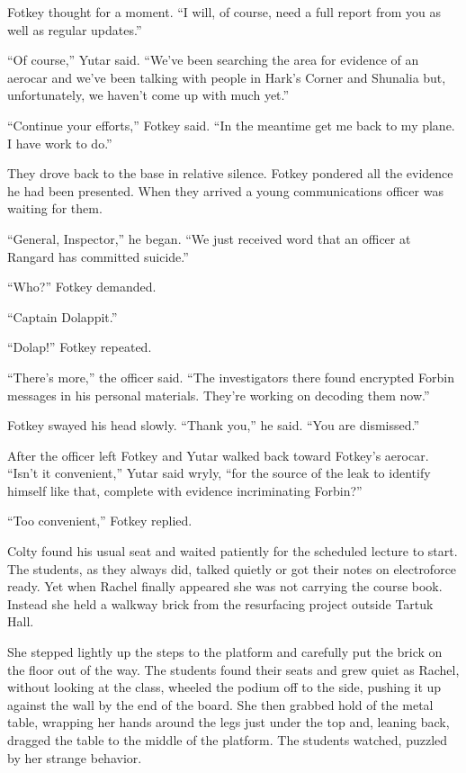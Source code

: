 Fotkey thought for a moment. ``I will, of course, need a full report from you as well as regular
updates.''

``Of course,'' Yutar said. ``We've been searching the area for evidence of an aerocar and we've
been talking with people in Hark's Corner and Shunalia but, unfortunately, we haven't come up
with much yet.''

``Continue your efforts,'' Fotkey said. ``In the meantime get me back to my plane. I have work
to do.''

They drove back to the base in relative silence. Fotkey pondered all the evidence he had been
presented. When they arrived a young communications officer was waiting for them.

``General, Inspector,'' he began. ``We just received word that an officer at Rangard has
committed suicide.''

``Who?'' Fotkey demanded.

``Captain Dolappit.''

``Dolap!'' Fotkey repeated.

``There's more,'' the officer said. ``The investigators there found encrypted Forbin messages in
his personal materials. They're working on decoding them now.''

Fotkey swayed his head slowly. ``Thank you,'' he said. ``You are dismissed.''

After the officer left Fotkey and Yutar walked back toward Fotkey's aerocar. ``Isn't it
convenient,'' Yutar said wryly, ``for the source of the leak to identify himself like that,
complete with evidence incriminating Forbin?''

``Too convenient,'' Fotkey replied.

\spacebreak

Colty found his usual seat and waited patiently for the scheduled lecture to start. The
students, as they always did, talked quietly or got their notes on electroforce ready. Yet when
Rachel finally appeared she was not carrying the course book. Instead she held a walkway brick
from the resurfacing project outside Tartuk Hall.

She stepped lightly up the steps to the platform and carefully put the brick on the floor out of
the way. The students found their seats and grew quiet as Rachel, without looking at the class,
wheeled the podium off to the side, pushing it up against the wall by the end of the board. She
then grabbed hold of the metal table, wrapping her hands around the legs just under the top and,
leaning back, dragged the table to the middle of the platform. The students watched, puzzled by
her strange behavior.

